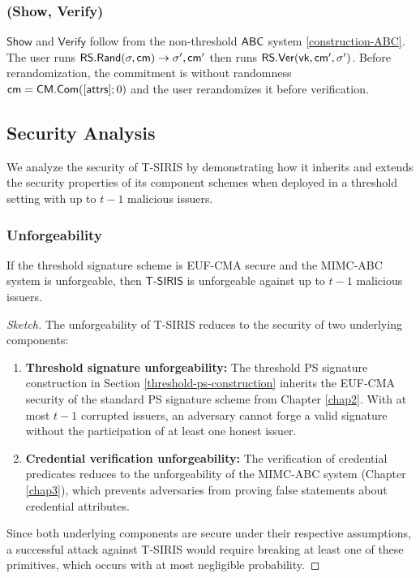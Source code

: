 \subsubsection*{(Show, Verify)}
$\mathsf{Show}$ and $\mathsf{Verify}$ follow from the non-threshold $\mathsf{ABC}$ system \ref{construction-ABC}. The user runs $\mathsf{RS.Rand}(\sigma, \mathsf{cm}) \to \sigma', \mathsf{cm}'$ then runs $\mathsf{RS.Ver}(\mathsf{vk}, \mathsf{cm}', \sigma')$. Before rerandomization, the commitment is without randomness $\mathsf{cm} = \mathsf{CM.Com}([\mathsf{attrs}]; 0)$ and the user rerandomizes it before verification.


\subsection{Security Analysis}
\label{sec:threshold-security}

We analyze the security of T-SIRIS by demonstrating how it inherits and extends the security properties of its component schemes when deployed in a threshold setting with up to $t-1$ malicious issuers.

\subsubsection{Unforgeability}

\begin{theorem}[Unforgeability]
If the threshold signature scheme is EUF-CMA secure and the MIMC-ABC system is unforgeable, then $\mathsf{T\text{-}SIRIS}$ is unforgeable against up to $t-1$ malicious issuers.
\end{theorem}

\begin{proof}[Sketch]
The unforgeability of T-SIRIS reduces to the security of two underlying components:

\begin{enumerate}
    \item \textbf{Threshold signature unforgeability:} The threshold PS signature construction in Section \ref{threshold-ps-construction} inherits the EUF-CMA security of the standard PS signature scheme from Chapter \ref{chap2}. With at most $t-1$ corrupted issuers, an adversary cannot forge a valid signature without the participation of at least one honest issuer.
    
    \item \textbf{Credential verification unforgeability:} The verification of credential predicates reduces to the unforgeability of the MIMC-ABC system (Chapter \ref{chap3}), which prevents adversaries from proving false statements about credential attributes.
\end{enumerate}

Since both underlying components are secure under their respective assumptions, a successful attack against T-SIRIS would require breaking at least one of these primitives, which occurs with at most negligible probability.
\end{proof}

